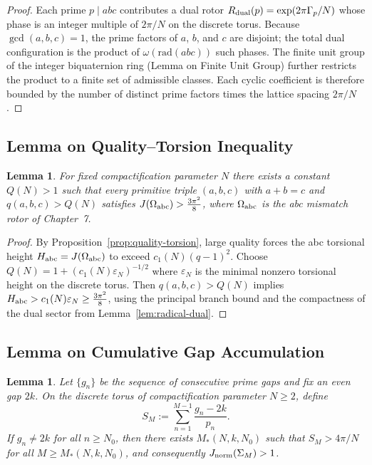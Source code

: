 \documentclass[dvipdfmx,a4paper]{article}
\newtheorem{lemma}[theorem]{Lemma}
\theoremstyle{definition}
\theoremstyle{remark}
\newcommand{\Jnorm}{J_{\rm norm}}
\newcommand{\Jbound}{\frac{3\pi^2}{8}}
\begin{document}
\begin{proof}
Each prime \( p \mid abc \) contributes a dual rotor \( R_{\rm dual}(p) = \exp(2\pi \Gamma_p / N) \) whose phase is an integer multiple of \( 2\pi/N \) on the discrete torus. Because \( \gcd(a,b,c) = 1 \), the prime factors of \( a \), \( b \), and \( c \) are disjoint; the total dual configuration is the product of \( \omega(\mathrm{rad}(abc)) \) such phases. The finite unit group of the integer biquaternion ring (Lemma on Finite Unit Group) further restricts the product to a finite set of admissible classes. Each cyclic coefficient is therefore bounded by the number of distinct prime factors times the lattice spacing \( 2\pi/N \).
\end{proof}

\subsection{Lemma on Quality--Torsion Inequality}
\label{lem:quality-torsion}

\begin{lemma}
For fixed compactification parameter \( N \) there exists a constant \( Q(N) > 1 \) such that every primitive triple \( (a,b,c) \) with \( a + b = c \) and \( q(a,b,c) > Q(N) \) satisfies \( J(\Omega_{\rm abc}) > \Jbound \), where \( \Omega_{\rm abc} \) is the abc mismatch rotor of Chapter~7.
\end{lemma}

\begin{proof}
By Proposition~\ref{prop:quality-torsion}, large quality forces the abc torsional height \( H_{\rm abc} = J(\Omega_{\rm abc}) \) to exceed \( c_1(N)(q - 1)^2 \). Choose \( Q(N) = 1 + (c_1(N) \varepsilon_N)^{-1/2} \) where \( \varepsilon_N \) is the minimal nonzero torsional height on the discrete torus. Then \( q(a,b,c) > Q(N) \) implies \( H_{\rm abc} > c_1(N) \varepsilon_N \geq \Jbound \), using the principal branch bound and the compactness of the dual sector from Lemma~\ref{lem:radical-dual}.
\end{proof}

\subsection{Lemma on Cumulative Gap Accumulation}
\label{lem:gap-accumulation}

\begin{lemma}
Let \( \{g_n\} \) be the sequence of consecutive prime gaps and fix an even gap \( 2k \). On the discrete torus of compactification parameter \( N \geq 2 \), define
\[
S_M := \sum_{n=1}^{M-1} \frac{g_n - 2k}{p_n}.
\]
If \( g_n \neq 2k \) for all \( n \geq N_0 \), then there exists \( M_*(N,k,N_0) \) such that \( S_M > 4\pi/N \) for all \( M \geq M_*(N,k,N_0) \), and consequently \( \Jnorm(\Sigma_M) > 1 \).
\end{lemma}
\end{document}
